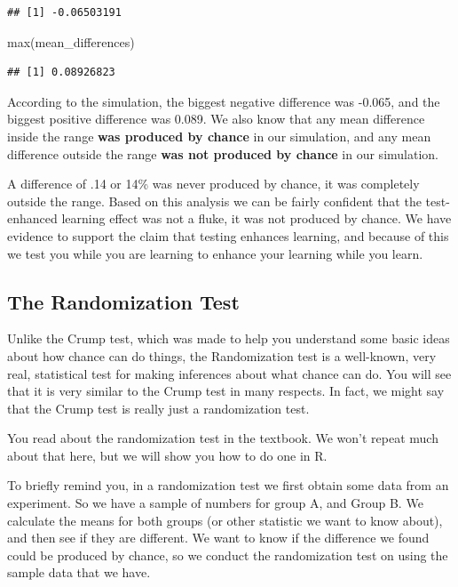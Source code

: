 \documentclass[
]{book}
\newenvironment{Shaded}{\begin{snugshade}}{\end{snugshade}}
\newcommand{\FunctionTok}[1]{\textcolor[rgb]{0.00,0.00,0.00}{#1}}
\newcommand{\NormalTok}[1]{#1}
\begin{document}
\begin{verbatim}
## [1] -0.06503191
\end{verbatim}

\begin{Shaded}
\begin{Highlighting}[]
\FunctionTok{max}\NormalTok{(mean\_differences)}
\end{Highlighting}
\end{Shaded}

\begin{verbatim}
## [1] 0.08926823
\end{verbatim}

According to the simulation, the biggest negative difference was -0.065, and the biggest positive difference was 0.089. We also know that any mean difference inside the range \textbf{was produced by chance} in our simulation, and any mean difference outside the range \textbf{was not produced by chance} in our simulation.

A difference of .14 or 14\% was never produced by chance, it was completely outside the range. Based on this analysis we can be fairly confident that the test-enhanced learning effect was not a fluke, it was not produced by chance. We have evidence to support the claim that testing enhances learning, and because of this we test you while you are learning to enhance your learning while you learn.

\hypertarget{the-randomization-test}{%
\subsection{The Randomization Test}\label{the-randomization-test}}

Unlike the Crump test, which was made to help you understand some basic ideas about how chance can do things, the Randomization test is a well-known, very real, statistical test for making inferences about what chance can do. You will see that it is very similar to the Crump test in many respects. In fact, we might say that the Crump test is really just a randomization test.

You read about the randomization test in the textbook. We won't repeat much about that here, but we will show you how to do one in R.

To briefly remind you, in a randomization test we first obtain some data from an experiment. So we have a sample of numbers for group A, and Group B. We calculate the means for both groups (or other statistic we want to know about), and then see if they are different. We want to know if the difference we found could be produced by chance, so we conduct the randomization test on using the sample data that we have.
\end{document}
